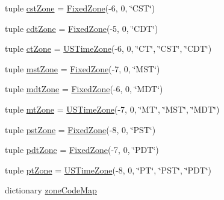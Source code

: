 \begin{DoxyCompactItemize}
\item 
tuple \hyperlink{namespaceamonpy_1_1sim_1_1sidereal__m_a06155fc3f17c03e1aabd0ca129327824}{cst\-Zone} = \hyperlink{classamonpy_1_1sim_1_1sidereal__m_1_1_fixed_zone}{Fixed\-Zone}(-\/6, 0, \char`\"{}C\-S\-T\char`\"{})
\item 
tuple \hyperlink{namespaceamonpy_1_1sim_1_1sidereal__m_a0eef9e52f3d63079c0d7b3a3c4b4071a}{cdt\-Zone} = \hyperlink{classamonpy_1_1sim_1_1sidereal__m_1_1_fixed_zone}{Fixed\-Zone}(-\/5, 0, \char`\"{}C\-D\-T\char`\"{})
\item 
tuple \hyperlink{namespaceamonpy_1_1sim_1_1sidereal__m_a71f74fd0baa93de2e3a874ebc8ed61d3}{ct\-Zone} = \hyperlink{classamonpy_1_1sim_1_1sidereal__m_1_1_u_s_time_zone}{U\-S\-Time\-Zone}(-\/6, 0, \char`\"{}C\-T\char`\"{}, \char`\"{}C\-S\-T\char`\"{}, \char`\"{}C\-D\-T\char`\"{})
\item 
tuple \hyperlink{namespaceamonpy_1_1sim_1_1sidereal__m_a4874e931a2ffa48d89e1df2cc9ea2743}{mst\-Zone} = \hyperlink{classamonpy_1_1sim_1_1sidereal__m_1_1_fixed_zone}{Fixed\-Zone}(-\/7, 0, \char`\"{}M\-S\-T\char`\"{})
\item 
tuple \hyperlink{namespaceamonpy_1_1sim_1_1sidereal__m_ac8316d030fa26bccdcce995a5f57f363}{mdt\-Zone} = \hyperlink{classamonpy_1_1sim_1_1sidereal__m_1_1_fixed_zone}{Fixed\-Zone}(-\/6, 0, \char`\"{}M\-D\-T\char`\"{})
\item 
tuple \hyperlink{namespaceamonpy_1_1sim_1_1sidereal__m_a80909105a843798d6a1210feddc35a4d}{mt\-Zone} = \hyperlink{classamonpy_1_1sim_1_1sidereal__m_1_1_u_s_time_zone}{U\-S\-Time\-Zone}(-\/7, 0, \char`\"{}M\-T\char`\"{}, \char`\"{}M\-S\-T\char`\"{}, \char`\"{}M\-D\-T\char`\"{})
\item 
tuple \hyperlink{namespaceamonpy_1_1sim_1_1sidereal__m_aaa8d0a3e675960c403a39cfae69909a9}{pst\-Zone} = \hyperlink{classamonpy_1_1sim_1_1sidereal__m_1_1_fixed_zone}{Fixed\-Zone}(-\/8, 0, \char`\"{}P\-S\-T\char`\"{})
\item 
tuple \hyperlink{namespaceamonpy_1_1sim_1_1sidereal__m_a91dab6aa12f619a32e01ee9f4e8cec4b}{pdt\-Zone} = \hyperlink{classamonpy_1_1sim_1_1sidereal__m_1_1_fixed_zone}{Fixed\-Zone}(-\/7, 0, \char`\"{}P\-D\-T\char`\"{})
\item 
tuple \hyperlink{namespaceamonpy_1_1sim_1_1sidereal__m_a72b55d3f3fb71e3e634d985a9034d1a2}{pt\-Zone} = \hyperlink{classamonpy_1_1sim_1_1sidereal__m_1_1_u_s_time_zone}{U\-S\-Time\-Zone}(-\/8, 0, \char`\"{}P\-T\char`\"{}, \char`\"{}P\-S\-T\char`\"{}, \char`\"{}P\-D\-T\char`\"{})
\item 
dictionary \hyperlink{namespaceamonpy_1_1sim_1_1sidereal__m_aac98a8043e8f150f085d5d35e9420702}{zone\-Code\-Map}

\end{DoxyCompactItemize}
